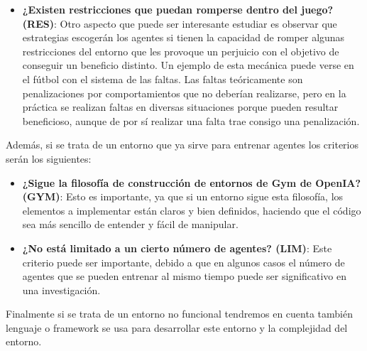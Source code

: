 \begin{itemize}
    \item \textbf{¿Existen restricciones que puedan romperse dentro del juego? (RES)}: Otro aspecto que puede ser interesante estudiar es observar que estrategias escogerán los agentes si tienen la capacidad de romper algunas restricciones del entorno que les provoque un perjuicio con el objetivo de conseguir un beneficio distinto. Un ejemplo de esta mecánica puede verse en el fútbol con el sistema de las faltas. Las faltas teóricamente son penalizaciones por comportamientos que no deberían realizarse, pero en la práctica se realizan faltas en diversas situaciones porque pueden resultar beneficioso, aunque de por sí realizar una falta trae consigo una penalización.
\end{itemize}

Además, si se trata de un entorno que ya sirve para entrenar agentes los criterios serán los siguientes:
\begin{itemize}
    \item \textbf{¿Sigue la filosofía de construcción de entornos de Gym de OpenIA? (GYM)}: Esto es importante, ya que si un entorno sigue esta filosofía, los elementos a implementar están claros y bien definidos, haciendo que el código sea más sencillo de entender y fácil de manipular. 
    \item \textbf{¿No está limitado a un cierto número de agentes? (LIM)}: Este criterio puede ser importante, debido a que en algunos casos el número de agentes que se pueden entrenar al mismo tiempo puede ser significativo en una investigación.
\end{itemize}

Finalmente si se trata de un entorno no funcional tendremos en cuenta también lenguaje o framework se usa para desarrollar este entorno y la complejidad del entorno.




